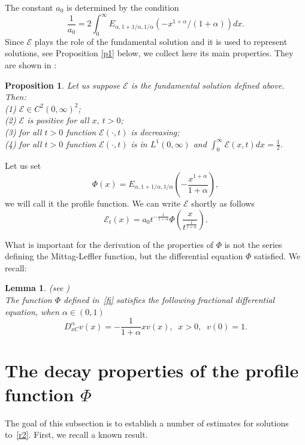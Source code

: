 \documentclass{article}
\newtheorem{proposition}{Proposition}
\newtheorem{lemma}{Lemma}
\def\sE{{\mathscr{E}}}
\begin{document}
The constant $a_0$ is determined by the condition
\begin{equation*}%
\frac{1}{a_0}=2\int_0^\infty E_{\alpha,1+1/\alpha,1/\alpha}\left(-x^{1+\alpha}/(1+\alpha)\right)dx.
\end{equation*}  
Since $\sE$ plays the role of the fundamental solution and it is used to represent solutions, see Proposition \ref{p1} below, we collect here its main properties.  They are shown in \cite[Theorem 1]{NRS}:\\
\begin{proposition}\label{p0} Let us suppose $\sE$ is the fundamental solution defined above. Then:
\\(1) $\sE\in C^2(0,\infty)^2$;\\
    (2) $\sE$ is positive for all $x,\ t>0$;\\
    (3) for all $t>0$ function $\sE(\cdot,t)$ is decreasing;\\
    (4) for all $t>0$ function $\sE(\cdot,t)$ is in $L^1(0,\infty)$ and $\displaystyle{\int_0^\infty \sE(x,t)dx=\frac{1}{2}.}$ 
\end{proposition}
    
Let us set 
\begin{equation}\label{fi}
\Phi(x)= E_{\alpha,1+1/\alpha,1/\alpha}\left(-\frac{x^{1+\alpha}}{1+\alpha}\right),
\end{equation}
we will call it the profile function.
We can write $\sE$ shortly as follows
\begin{equation}\label{df-e}
\sE_t(x)=%
a_0t^{-\frac{1}{1+\alpha}}\Phi\left(\frac{x}{t^{\frac{1}{1+\alpha}}}\right).
\end{equation}

What is important for the derivation of the properties of $\Phi$ is not the series defining the Mittag-Leffler function, but the differential equation $\Phi$ satisfied. 
We recall:
\begin{lemma}(see \cite[Proposition 1]{NRS})
\label{L_rown}\\
The function $\Phi$ defined in~\eqref{fi} satisfies the following fractional differential equation, when $\alpha\in (0,1)$
\begin{equation}\label{r2}
    D^\alpha_{xC}v(x)=-\frac{1}{1+\alpha} xv(x),\;\; x>0,\;\; v(0)=1.
\end{equation}\end{lemma}


\section{The  decay properties of the profile function $\Phi$}\label{s3}
The goal of this subsection is to establish a number of estimates for solutions to~\eqref{r2}. First, we recall a known result.
\end{document}
